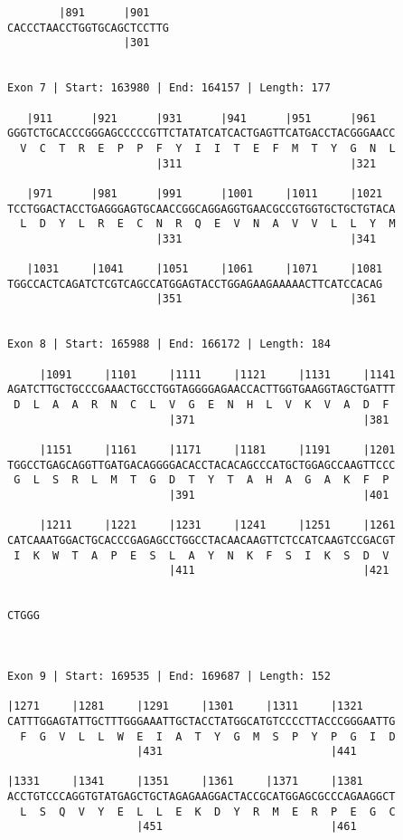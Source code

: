 \documentclass{article}
\begin{document}
\begin{Verbatim}
        |891      |901   
CACCCTAACCTGGTGCAGCTCCTTG
                  |301   
  
 
Exon 7 | Start: 163980 | End: 164157 | Length: 177
 
   |911      |921      |931      |941      |951      |961   
GGGTCTGCACCCGGGAGCCCCCGTTCTATATCATCACTGAGTTCATGACCTACGGGAACC
  V  C  T  R  E  P  P  F  Y  I  I  T  E  F  M  T  Y  G  N  L
                       |311                          |321   
  
   |971      |981      |991      |1001     |1011     |1021  
TCCTGGACTACCTGAGGGAGTGCAACCGGCAGGAGGTGAACGCCGTGGTGCTGCTGTACA
  L  D  Y  L  R  E  C  N  R  Q  E  V  N  A  V  V  L  L  Y  M
                       |331                          |341   
  
   |1031     |1041     |1051     |1061     |1071     |1081
TGGCCACTCAGATCTCGTCAGCCATGGAGTACCTGGAGAAGAAAAACTTCATCCACAG
                       |351                          |361 
  
 
Exon 8 | Start: 165988 | End: 166172 | Length: 184
 
     |1091     |1101     |1111     |1121     |1131     |1141
AGATCTTGCTGCCCGAAACTGCCTGGTAGGGGAGAACCACTTGGTGAAGGTAGCTGATTT
 D  L  A  A  R  N  C  L  V  G  E  N  H  L  V  K  V  A  D  F 
                         |371                          |381 
  
     |1151     |1161     |1171     |1181     |1191     |1201
TGGCCTGAGCAGGTTGATGACAGGGGACACCTACACAGCCCATGCTGGAGCCAAGTTCCC
 G  L  S  R  L  M  T  G  D  T  Y  T  A  H  A  G  A  K  F  P 
                         |391                          |401 
  
     |1211     |1221     |1231     |1241     |1251     |1261
CATCAAATGGACTGCACCCGAGAGCCTGGCCTACAACAAGTTCTCCATCAAGTCCGACGT
 I  K  W  T  A  P  E  S  L  A  Y  N  K  F  S  I  K  S  D  V 
                         |411                          |421 
  
     
CTGGG
     
  
 
Exon 9 | Start: 169535 | End: 169687 | Length: 152
 
|1271     |1281     |1291     |1301     |1311     |1321     
CATTTGGAGTATTGCTTTGGGAAATTGCTACCTATGGCATGTCCCCTTACCCGGGAATTG
  F  G  V  L  L  W  E  I  A  T  Y  G  M  S  P  Y  P  G  I  D
                    |431                          |441      
  
|1331     |1341     |1351     |1361     |1371     |1381     
ACCTGTCCCAGGTGTATGAGCTGCTAGAGAAGGACTACCGCATGGAGCGCCCAGAAGGCT
  L  S  Q  V  Y  E  L  L  E  K  D  Y  R  M  E  R  P  E  G  C
                    |451                          |461      
  

\end{Verbatim}
\end{document}
